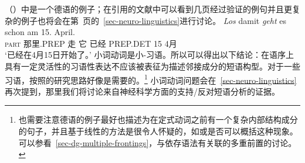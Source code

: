 \begin{exe}
\begin{xlist}[iv.]
\begin{exe}
\begin{xlist}[iv.]
（）中是一个德语的例子；在引用的文献中可以看到几页经过验证的例句并且更复杂的例子也将会在第~\pageref{ex-complex-vf}页的~\ref{sec-neuro-linguistics}进行讨论。
\ea\label{bsp-los-damit-zwei}
\gll \emph{Los} damit \emph{geht} es schon am 15. April.\footnotemark\\
      \textsc{part} 那里.PREP 走 它 已经 PREP.DET 15 4月\\%
%
\glt `已经在4月15日开始了。'
\z
小词动词是小-习语。所以可以得出以下结论：在语序上具有一定灵活性的习语性表达不应该被表征为描述邻接成分的短语构型。对于一些习语，按照的研究思路好像是需要的。\footnote{也需要注意德语的例子最好也描述为在定式动词之前有一个复杂内部结构成分的句子，并且基于线性的方法是很令人怀疑的，如或是否可以概括这种现象。可以参看~\ref{sec-dg-multiple-frontings}，与依存语法有关联的多重前置的讨论。
}
小词动词问题会在~\ref{sec-neuro-linguistics}再次提到，那里我们将讨论来自神经科学方面的支持/反对短语分析的证据。


\end{xlist}
\end{exe}
\end{xlist}
\end{exe}
